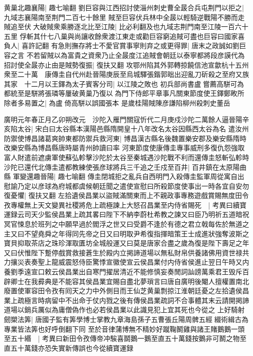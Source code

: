 黄巢北趣襄陽|{
	趣七喻翻}
劉巨容與江西招討使淄州刺史曹全晸合兵屯荆門以拒之|{
	九域志襄陽南至荆門二百七十餘里}
賊至巨容伏兵林中全晸以輕騎逆戰陽不勝而走賊追至伏大破賊衆乘勝逐北比至江陵|{
	比必利翻及也九域志荆門南至江陵一百六十五里}
俘斬其什七八巢與尚讓收餘衆渡江東走或勸巨容窮追賊可盡也巨容曰國家喜負人|{
	喜許記翻}
有急則撫存將士不愛官賞事寧則弃之或更得罪|{
	唐末之政誠如劉巨容之言}
不若留賊以為富貴之資衆乃止全晸度江追賊會朝廷以泰寧都將段彦謨代為招討使全晸亦止由是賊勢復振|{
	復扶又翻}
攻鄂州陷其外郭轉掠饒信池宣歙杭十五州衆至二十萬　康傳圭自代州赴晉陽庚辰至烏城驛張鍇郭昢出迎亂刀斫殺之至府又族其家　十二月以王鐸為太子賓客分司|{
	以江陵之敗也}
初兵部尚書盧嘗薦高駢可為都統至是駢將張璘等屢破黄巢乃復以為門下侍郎平章事凡關東節度使王鐸鄭畋所除者多易置之|{
	為盧倚高駢以誤國張本}
是歲桂陽賊陳彦謙陷柳州殺刺史董岳

廣明元年春正月乙卯朔改元　沙陀入雁門關寇忻代二月庚戍沙陀二萬餘人逼晉陽辛亥陷太谷|{
	宋白曰太谷縣本漢陽邑縣隋開皇十八年改名太谷因縣西太谷為名}
遣汝州防禦使博昌諸葛爽帥東都防禦兵救河東|{
	博昌漢古縣名後魏置樂安郡及樂安縣隋時改樂安縣為博昌縣唐時屬青州帥讀曰率}
河東節度使康傳圭專事威刑多復仇怨強取富人財遣前遮虜軍使蘇弘軫擊沙陀於太谷至秦城遇沙陀戰不利而還傳圭怒斬弘軫時沙陀已還代北傳圭遣都教練使張彦球將兵三千追之壬戍至百井|{
	百井鎮在太原陽曲縣}
軍變還趣晉陽|{
	趣七喻翻}
傳圭閉城拒之亂兵自西明門入殺傳圭監軍周從寓自出慰諭乃定以彦球為府城都虞候朝廷聞之遣使宣慰曰所殺節度使事出一時各宜自安勿復憂懼|{
	復扶又翻}
左拾遺侯昌業以盜賊滿關東而上不親政事專務遊戲賞賜無度田令孜專權無上天文變異社稷將危上疏極諫上大怒召昌業至内侍省賜死　|{
	考異曰續寶運録云司天少監侯昌業上疏其畧曰陛下不納李蔚杜希教之諫又曰臣乃明祈五道暗祝冥官悚息於班列之中願早過於閻浮之世又曰受爵不逢於有德之君立戟每佐於無道之主又曰不望堯舜之年得同先帝之日又曰明取尹希復指揮暗策王士成進狀強奪波斯之寶貝抑取茶店之珠珍渾取匱坊全城般運又曰莫是唐家合盡之歲為復是陛下壽足之年又曰伏惟陛下蹔停戲賞救接蒼生於殿内立掲諦道場以無私財帛供養諸佛用資世禄共力攘災表奏聖上龍威震怒侍臣驚悸宣徽使宣云侯昌業付内侍省侯進止翌日午時又内養劉季遠宣口敕云侯昌業出自寒門擢居清近不能修慎妄奏閒詞訕謗萬乘君王毁斥百辟卿士在我彛典是不能容其侯昌業宜賜自盡北夢瑣言曰唐自廣明後閹人擅權置南北廢置使軍容田令孜有囘天之力中外側目而王仙芝黄巢剽掠江淮朝廷憂之左拾遺侯昌業上疏極言時病留中不出命于仗内戮之後有傳侯昌業疏詞不合事體其末云請開掲諦道場以銷兵厲似為庸僧偽作也必若侯昌業以此識見犯上宜其死也今從之}
上好騎射劒槊法筭|{
	唐國子監有筭學博士掌教九章海島孫子五曹張丘陽周髀五經綴術緝古為專業皆法筭也好呼倒翻下同}
至於音律蒲博無不精妙好蹴鞠鬭雞與諸王賭鵝鵝一頭至五十緡　|{
	考異曰新田令孜傳帝冲騃喜鬬鵝一鵝至直五十萬錢按鵝非可鬭之物至直五十萬錢亦恐失實新傳誤也今從續寶運録}
